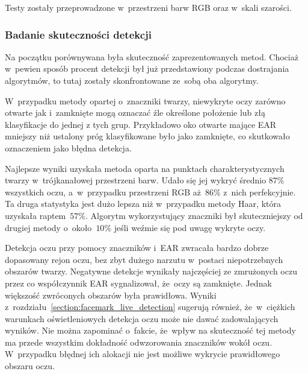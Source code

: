 \par

Testy zostały przeprowadzone w~przestrzeni barw RGB oraz w~skali szarości.

\subsubsection{Badanie skuteczności detekcji}

Na początku porównywana była skuteczność zaprezentowanych metod. Chociaż w~pewien sposób procent detekcji był już przedstawiony podczas dostrajania algorytmów, to tutaj zostały skonfrontowane ze~sobą oba algorytmy.

\par

W~przypadku metody opartej o~znaczniki twarzy, niewykryte oczy zarówno otwarte jak i~zamknięte mogą oznaczać źle określone położenie lub złą klasyfikacje do jednej z tych grup. Przykładowo oko otwarte mające EAR mniejszy niż ustalony próg klasyfikowane było jako zamknięte, co skutkowało oznaczeniem jako błędna detekcja. 



Najlepsze wyniki uzyskała metoda oparta na punktach charakterystycznych twarzy w~trójkanałowej przestrzeni barw. Udało się jej wykryć średnio $87\%$ wszystkich oczu, a~w~przypadku przestrzeni RGB aż~$86 \%$ z~nich perfekcyjnie. Ta druga statystyka jest dużo lepsza niż w~przypadku metody Haar, która uzyskała raptem~$57\%$. Algorytm wykorzystujący znaczniki był skuteczniejszy od drugiej metody o~około~$10\%$ jeśli weźmie się pod uwagę wykryte oczy. 

\par

Detekcja oczu przy pomocy znaczników i~EAR zwracała bardzo dobrze dopasowany rejon oczu, bez zbyt dużego narzutu w~postaci niepotrzebnych obszarów twarzy. Negatywne detekcje wynikały najczęściej ze zmrużonych oczu przez co współczynnik EAR sygnalizował, że~oczy są zamknięte. Jednak większość zwróconych obszarów była prawidłowa. Wyniki z~rozdziału~\ref{section:facemark_live_detection} sugerują również, że~w~ciężkich warunkach oświetleniowych detekcja oczu może nie dawać zadowalających wyników. Nie można zapominać o~fakcie, że~wpływ na skuteczność tej metody ma przede wszystkim dokładność odwzorowania znaczników wokół oczu. W~przypadku błędnej ich alokacji nie jest możliwe wykrycie prawidłowego obszaru oczu. 

\par

